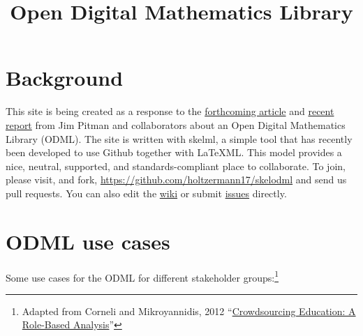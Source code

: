 \documentclass{article}
\begin{document}
\title{Open Digital Mathematics Library}

\maketitle

\section{Background}

This site is being created as a response to the  \href{http://www.mathunion.org/fileadmin/CEIC/planning_wdml.pdf}{forthcoming article} and
 \href{http://arxiv.org/abs/1404.1905}{recent report} from Jim Pitman and collaborators about an Open Digital Mathematics Library (ODML).
%
The site is written with skelml, a simple tool that has recently been developed to use Github together with \LaTeX ML.  This model provides a nice, neutral, supported, and standards-compliant place to collaborate.  To join, please visit, and fork, \url{https://github.com/holtzermann17/skelodml} and send us pull requests.  You can also edit the \href{https://github.com/holtzermann17/skelodml/wiki}{wiki} or
submit \href{https://github.com/holtzermann17/skelodml/issues}{issues} directly.

\section{ODML use cases}

Some use cases for the ODML for different stakeholder groups:\footnote{Adapted from Corneli and Mikroyannidis, 2012 ``\href{http://oro.open.ac.uk/33221/1/corneli_chap_okada_book.pdf}{Crowdsourcing Education: A Role-Based Analysis}''}
\end{document}

